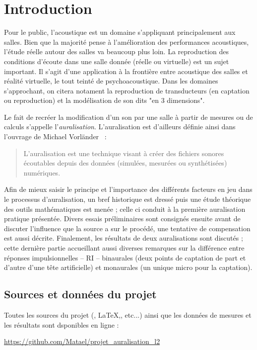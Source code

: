 \chapter*{Introduction}
Pour le public, l'acoustique est un domaine s'appliquant principalement aux salles.
Bien que la majorité pense à l'amélioration des performances acoustiques, l'étude réelle autour des salles va
beaucoup plus loin.
La reproduction des conditions d'écoute dans une salle donnée (réelle ou virtuelle) est un sujet important. Il s'agit d'une
application à la frontière entre acoustique des salles et réalité virtuelle, le tout teinté de psychoacoustique. Dans les
domaines s'approchant, on citera notament la reproduction de transducteurs (en captation ou reproduction) et la modélisation de son dits "en 3 dimensions".

\medskip

Le fait de recréer la modification d'un son par une salle à partir de mesures ou de calculs s'appelle
l'\emph{auralisation}. L'auralisation est d'ailleurs définie ainsi dans l'ouvrage de Michael
Vorländer~\cite{Vor08} :

\begin{quote}
L'auralisation est une technique visant à créer des fichiers sonores écoutables depuis des données (simulées, mesurées
ou synthétisées) numériques.

\end{quote}

\medskip

Afin de mieux saisir le principe et l'importance des différents facteurs en jeu dans le processus d'auralisation, un bref historique est dressé puis une étude théorique des outils mathématiques est menée ; celle ci conduit à la première auralisation pratique présentée. Divers essais préliminaires sont consignés ensuite avant de discuter l'influence que la source a sur le procédé, une tentative de compensation est aussi décrite. Finalement, les résultats de deux auralisations sont discutés ; cette dernière partie accueillant aussi diverses remarques sur la différence entre réponses impulsionnelles -- RI -- binaurales (deux points de captation de part et
d'autre d'une tête artificielle) et monaurales (un unique micro pour la captation).

\bigskip
\bigskip

\section*{Sources et données du projet}

Toutes les sources du projet (\Matlab{}, \LaTeX{},, etc...) ainsi que les données de mesures et les résultats sont
dsponibles en ligne :

\begin{center}
\url{https://github.com/Matael/projet_auralisation_l2}
\end{center}

